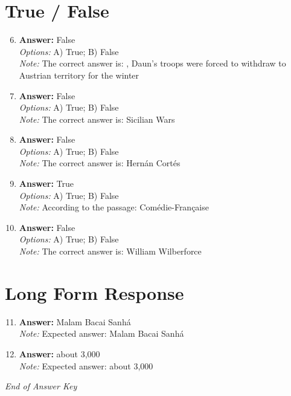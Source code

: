 \documentclass[12pt]{article}
\begin{document}
\section*{True / False}
\begin{enumerate}[label=\arabic*.]
\setcounter{enumi}{5}
\item \textbf{Answer:} False
\\ \textit{Options:} A) True; B) False
\\ \textit{Note:} The correct answer is: , Daun's troops were forced to withdraw to Austrian territory for the winter
\item \textbf{Answer:} False
\\ \textit{Options:} A) True; B) False
\\ \textit{Note:} The correct answer is: Sicilian Wars
\item \textbf{Answer:} False
\\ \textit{Options:} A) True; B) False
\\ \textit{Note:} The correct answer is: Hernán Cortés
\item \textbf{Answer:} True
\\ \textit{Options:} A) True; B) False
\\ \textit{Note:} According to the passage: Comédie-Française
\item \textbf{Answer:} False
\\ \textit{Options:} A) True; B) False
\\ \textit{Note:} The correct answer is: William Wilberforce
\end{enumerate}

\section*{Long Form Response}
\begin{enumerate}[label=\arabic*.]
\setcounter{enumi}{10}
\item \textbf{Answer:} Malam Bacai Sanhá
\\ \textit{Note:} Expected answer: Malam Bacai Sanhá
\item \textbf{Answer:} about 3,000
\\ \textit{Note:} Expected answer: about 3,000
\end{enumerate}

\vfill
\noindent\textit{End of Answer Key}
\end{document}

